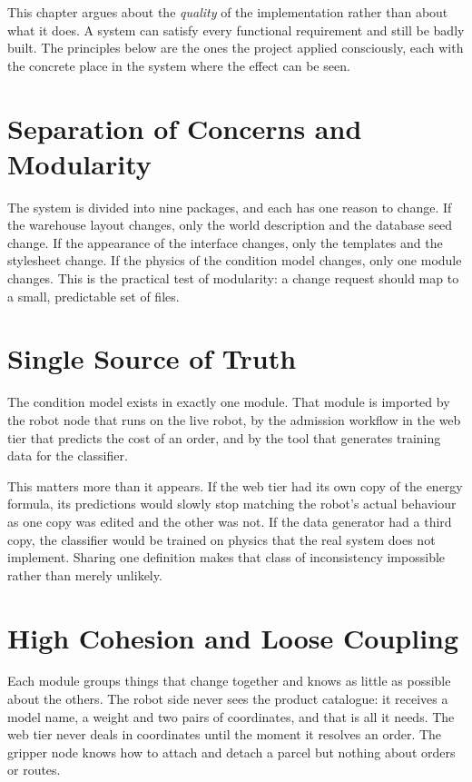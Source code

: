 \documentclass[12pt,a4paper]{report}
\begin{document}
This chapter argues about the \emph{quality} of the implementation rather than about what it does.
A system can satisfy every functional requirement and still be badly built. The principles below
are the ones the project applied consciously, each with the concrete place in the system where the
effect can be seen.

\section{Separation of Concerns and Modularity}
The system is divided into nine packages, and each has one reason to change. If the warehouse
layout changes, only the world description and the database seed change. If the appearance of the
interface changes, only the templates and the stylesheet change. If the physics of the condition
model changes, only one module changes. This is the practical test of modularity: a change request
should map to a small, predictable set of files.

\section{Single Source of Truth}
The condition model exists in exactly one module. That module is imported by the robot node that
runs on the live robot, by the admission workflow in the web tier that predicts the cost of an
order, and by the tool that generates training data for the classifier.

This matters more than it appears. If the web tier had its own copy of the energy formula, its
predictions would slowly stop matching the robot's actual behaviour as one copy was edited and the
other was not. If the data generator had a third copy, the classifier would be trained on physics
that the real system does not implement. Sharing one definition makes that class of inconsistency
impossible rather than merely unlikely.

\section{High Cohesion and Loose Coupling}
Each module groups things that change together and knows as little as possible about the others.
The robot side never sees the product catalogue: it receives a model name, a weight and two pairs of
coordinates, and that is all it needs. The web tier never deals in coordinates until the moment it
resolves an order. The gripper node knows how to attach and detach a parcel but nothing about
orders or routes.
\end{document}
